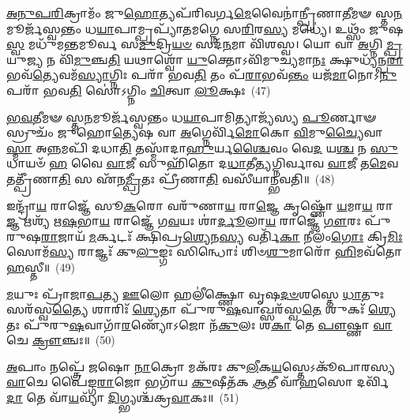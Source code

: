 \-\ul{𑌅}\-\-\ul{𑌨𑍁}\-\-\ul{𑌪}\-\-\ul{𑌰𑌿}\-𑌕𑍍𑌰𑌾𑌮𑌂᳴ 𑌜𑍁\-\ul{𑌹𑍋}\-𑌤𑍍𑌯𑌪᳴𑌰𑌿𑌵𑌰𑍍𑌗\-\ul{𑌮𑍇}\-𑌵𑍈𑌨𑌾॑𑌨𑍍𑌪𑍍𑌰𑍀𑌣𑌾\-\ul{𑌤𑍀}\-𑌮𑍟 𑌸𑍍𑌤\-\ul{𑌨}\-𑌮𑍂𑌰𑍍𑌜᳴𑌸𑍍𑌵𑌨𑍍𑌤𑌂 𑌧\-\ul{𑌯𑌾}\-𑌪𑌾𑌮𑍍𑌪𑍍𑌰𑌪𑍍𑌯𑌾᳴𑌤𑌮𑌗𑍍𑌨𑍇 𑌸\-\ul{𑌰𑌿}\-𑌰\-\ul{𑌸𑍍𑌯} 𑌮𑌧𑍍𑌯𑍇॑। 𑌉𑌥𑍍𑌸𑌂᳴ 𑌜𑍁𑌷\-\ul{𑌸𑍍𑌵} 𑌮𑌧𑍁᳴𑌮𑌨𑍍𑌤𑌮𑍂𑌰𑍍𑌵 𑌸\-\ul{𑌮𑍁}\-𑌦𑍍𑌰𑌿\-\ul{𑌯}\-\-\ul{𑍞} 𑌸𑌦᳴\-\ul{𑌨}\-𑌮𑌾 𑌵𑌿᳴𑌶𑌸𑍍𑌵। 𑌯𑍋 𑌵𑌾 \ul{𑌅}\-𑌗𑍍𑌨𑌿\-\ul{𑌮𑍍𑌪𑍍𑌰}\-𑌯𑍁\-\ul{𑌜𑍍𑌯} 𑌨 𑌵𑌿᳴\-\ul{𑌮𑍁}\-𑌞𑍍𑌚\-\ul{𑌤𑌿} 𑌯𑌥𑌾𑌶𑍍𑌵𑍋᳴ \ul{𑌯𑍁}\-𑌕𑍍𑌤𑍋\-𑌽𑌵𑌿᳴𑌮𑍁𑌚𑍍𑌯𑌮𑌾\-\ul{𑌨𑌃} 𑌕𑍍𑌷𑍁𑌧𑍍𑌯᳴𑌨𑍍𑌪\-\ul{𑌰𑌾}\-𑌭𑌵᳴\-\ul{𑌤𑍍𑌯𑍇}\-𑌵𑌮᳴\-\ul{𑌸𑍍𑌯𑌾}\-𑌗𑍍𑌨𑌿𑌃 𑌪𑌰𑌾᳴ 𑌭𑌵\-\ul{𑌤𑌿} 𑌤𑌂 𑌪᳴\-\ul{𑌰𑌾}\-𑌭𑌵᳴\-\ul{𑌨𑍍𑌤𑌂} 𑌯𑌜᳴\-\ul{𑌮𑌾}\-𑌨𑍋\-𑌽\-\ul{𑌨𑍁} 𑌪𑌰𑌾᳴ 𑌭𑌵\-\ul{𑌤𑌿} 𑌸𑍋॑\-𑌽𑌗𑍍𑌨𑌿𑌂 \ul{𑌚𑌿}\-𑌤𑍍𑌵𑌾 \ul{𑌲𑍂}\-𑌕𑍍𑌷𑌃~(47)

\-\ul{𑌭}\-\-\ul{𑌵}\-\-\ul{𑌤𑍀}\-𑌮𑍟 𑌸𑍍𑌤\-\ul{𑌨}\-𑌮𑍂𑌰𑍍𑌜᳴𑌸𑍍𑌵𑌨𑍍𑌤𑌂 𑌧\-\ul{𑌯𑌾}\-𑌪𑌾𑌮𑌿𑌤𑍍𑌯𑌾𑌜𑍍𑌯᳴𑌸𑍍𑌯 \ul{𑌪𑍂}\-𑌰𑍍𑌣𑌾𑍟 𑌸𑍍𑌰𑍁𑌚𑌂᳴ 𑌜𑍁𑌹𑍋\-\ul{𑌤𑍍𑌯𑍇}\-𑌷 𑌵𑌾 \ul{𑌅}\-𑌗𑍍𑌨𑍇𑌰𑍍𑌵𑌿᳴\-\ul{𑌮𑍋}\-𑌕𑍋 \ul{𑌵𑌿}\-𑌮𑍁\-\ul{𑌚𑍍𑌯𑍈}\-𑌵𑌾\-\ul{𑌸𑍍𑌮𑌾} 𑌅\-\ul{𑌨𑍍𑌨}\-𑌮𑌪𑌿᳴ 𑌦𑌧𑌾\-\ul{𑌤𑌿} 𑌤𑌸𑍍𑌮𑌾᳴𑌦𑌾\-\ul{𑌹𑍁}\-𑌰𑍍𑌯\-\ul{𑌶𑍍𑌚𑍈}\-𑌵𑌂 𑌵𑍇\-\ul{𑌦} 𑌯\-\ul{𑌶𑍍𑌚} 𑌨 \ul{𑌸𑍁}\-𑌧𑌾𑌯𑍞᳴ \ul{𑌹} 𑌵𑍈 \ul{𑌵𑌾}\-𑌜𑍀 𑌸𑍁𑌹𑌿᳴𑌤𑍋 𑌦\-\ul{𑌧𑌾}\-𑌤𑍀\-\ul{𑌤𑍍𑌯}\-𑌗𑍍𑌨𑌿𑌰𑍍𑌵𑌾𑌵 \ul{𑌵𑌾}\-𑌜𑍀 𑌤\-\ul{𑌮𑍇}\-𑌵 𑌤𑌤𑍍𑌪𑍍𑌰𑍀᳴𑌣𑌾\-\ul{𑌤𑌿} 𑌸 𑌏᳴𑌨\-\ul{𑌮𑍍𑌪𑍍𑌰𑍀}\-𑌤𑌃 𑌪𑍍𑌰𑍀᳴𑌣𑌾\-\ul{𑌤𑌿} 𑌵𑌸𑍀᳴𑌯𑌾𑌨𑍍𑌭𑌵𑌤𑌿॥~(48)

{\anuvakamend[{\-\ul{𑌪𑍍𑌰}\-𑌤𑍀\-\ul{𑌚𑍀} 𑌦𑌿𑌕𑍍𑌤𑌸𑍍𑌯𑌾॑𑌸𑍍𑌤𑍇 \ul{𑌦𑍍𑌵𑌿}\-𑌷𑍍𑌮𑍋 𑌯𑌶𑍍𑌚᳴ 𑌨𑌿\-\ul{𑌲𑌿}\-𑌮𑍍𑌪𑌾 𑌨𑌾\-\ul{𑌮𑍇}\-𑌹 \ul{𑌗𑍃}\-𑌹𑌾 𑌇𑌤𑌿᳴ \ul{𑌲𑍂}\-𑌕𑍍𑌷𑍋 𑌵𑌸𑍀᳴𑌯𑌾𑌨𑍍𑌭𑌵𑌤𑌿}]}%

𑌇𑌨𑍍𑌦𑍍𑌰𑌾᳴\-\ul{𑌯} 𑌰𑌾𑌜𑍍𑌞𑍇᳴ 𑌸𑍂\-\ul{𑌕}\-𑌰𑍋 𑌵𑌰𑍁᳴𑌣𑌾\-\ul{𑌯} 𑌰𑌾\-\ul{𑌜𑍍𑌞𑍇} 𑌕𑍃𑌷𑍍𑌣𑍋᳴ \ul{𑌯}\-𑌮𑌾\-\ul{𑌯} 𑌰𑌾\-\ul{𑌜𑍍𑌞} 𑌋𑌶𑍍𑌯᳴ 𑌋\-\ul{𑌷}\-𑌭𑌾\-\ul{𑌯} 𑌰𑌾𑌜𑍍𑌞𑍇᳴ 𑌗\-\ul{𑌵}\-𑌯𑌃 𑌶𑌾॑\-\ul{𑌰𑍍𑌦𑍂}\-𑌲𑌾\-\ul{𑌯} 𑌰𑌾𑌜𑍍𑌞𑍇᳴ \ul{𑌗𑍗}\-𑌰𑌃 𑌪𑍁᳴𑌰𑍁𑌷\-\ul{𑌰𑌾}\-𑌜𑌾𑌯᳴ \ul{𑌮}\-𑌰𑍍𑌕𑌟𑌃᳴ 𑌕𑍍𑌷𑌿𑌪𑍍𑌰\-\ul{𑌶𑍍𑌯𑍇}\-𑌨\-\ul{𑌸𑍍𑌯} 𑌵𑌰𑍍𑌤𑌿᳴\-\ul{𑌕𑌾} 𑌨𑍀𑌲𑌂᳴\-\ul{𑌗𑍋𑌃} 𑌕𑍍𑌰𑌿\-\ul{𑌮𑌿𑌃} 𑌸𑍋𑌮᳴\-\ul{𑌸𑍍𑌯} 𑌰𑌾𑌜𑍍𑌞𑌃᳴ 𑌕𑍁\-\ul{𑌲𑍁}\-𑌙𑍍𑌗𑌃 𑌸𑌿𑌨𑍍𑌧𑍋𑌃॑ 𑌶𑌿𑍞\-\ul{𑌶𑍁}\-𑌮𑌾𑌰𑍋᳴ \ul{𑌹𑌿}\-𑌮𑌵᳴𑌤𑍋 \ul{𑌹}\-𑌸𑍍𑌤𑍀॥~(49)

{\anuvakamend[{𑌇𑌨𑍍𑌦𑍍𑌰𑌾᳴\-\ul{𑌯𑌾}\-𑌷𑍍𑌟𑌾𑌵𑌿𑍞᳴𑌶𑌤𑌿𑌃}]}%

\-\ul{𑌮}\-𑌯𑍁𑌃 𑌪𑍍𑌰𑌾᳴𑌜𑌾\-\ul{𑌪}\-𑌤𑍍𑌯 \ul{𑌊}\-𑌲𑍋 𑌹𑌲𑍀॑𑌕𑍍𑌷𑍍𑌣𑍋 𑌵𑍃𑌷\-\ul{𑌦}\-\-\ul{𑍞}\-𑌶𑌸𑍍𑌤𑍇 \ul{𑌧𑌾}\-𑌤𑍁𑌃 𑌸𑌰᳴𑌸𑍍𑌵\-\ul{𑌤𑍍𑌯𑍈} 𑌶𑌾𑌰𑌿𑌃᳴ \ul{𑌶𑍍𑌯𑍇}\-𑌤𑌾 𑌪𑍁᳴𑌰𑍁\-\ul{𑌷}\-𑌵𑌾𑌖𑍍𑌸𑌰᳴𑌸𑍍𑌵\-\ul{𑌤𑍇} 𑌶𑍁𑌕𑌃᳴ \ul{𑌶𑍍𑌯𑍇}\-𑌤𑌃 𑌪𑍁᳴𑌰𑍁\-\ul{𑌷}\-𑌵𑌾𑌗𑌾᳴\-\ul{𑌰}\-𑌣𑍍𑌯𑍋᳴\-𑌽𑌜𑍋 𑌨᳴\-\ul{𑌕𑍁}\-𑌲𑌃 𑌶\-\ul{𑌕𑌾} 𑌤𑍇 \ul{𑌪𑍗}\-𑌷𑍍𑌣𑌾 \ul{𑌵𑌾}\-𑌚𑍇 \ul{𑌕𑍍𑌰𑍗}\-𑌞𑍍𑌚𑌃॥~(50)

{\anuvakamend[{\-\ul{𑌮}\-𑌯𑍁𑌸𑍍𑌤𑍍𑌰𑌯𑍋᳴𑌵𑌿𑍞𑌶𑌤𑌿𑌃}]}%

\-\ul{𑌅}\-𑌪𑌾𑌂 𑌨𑌪𑍍𑌤𑍍𑌰𑍇᳴ \ul{𑌜}\-𑌷𑍋 \ul{𑌨𑌾}\-𑌕𑍍𑌰𑍋 𑌮𑌕᳴𑌰𑌃 𑌕𑍁\-\ul{𑌲𑍀}\-𑌕\-\ul{𑌯}\-𑌸𑍍𑌤𑍇\-𑌽𑌕𑍂᳴𑌪𑌾𑌰𑌸𑍍𑌯 \ul{𑌵𑌾}\-𑌚𑍇 𑌪𑍈॑𑌙𑍍𑌗\-\ul{𑌰𑌾}\-𑌜𑍋 𑌭𑌗𑌾᳴𑌯 \ul{𑌕𑍁}\-𑌷𑍀𑌤᳴𑌕 \ul{𑌆}\-𑌤𑍀 𑌵𑌾᳴\-\ul{𑌹}\-𑌸𑍋 𑌦𑌰𑍍𑌵𑌿᳴\-\ul{𑌦𑌾} 𑌤𑍇 𑌵𑌾᳴\-\ul{𑌯}\-𑌵𑍍𑌯𑌾᳴ \ul{𑌦𑌿}\-𑌗𑍍𑌭𑍍𑌯𑌶𑍍𑌚᳴𑌕𑍍𑌰\-\ul{𑌵𑌾}\-𑌕𑌃॥~(51)

